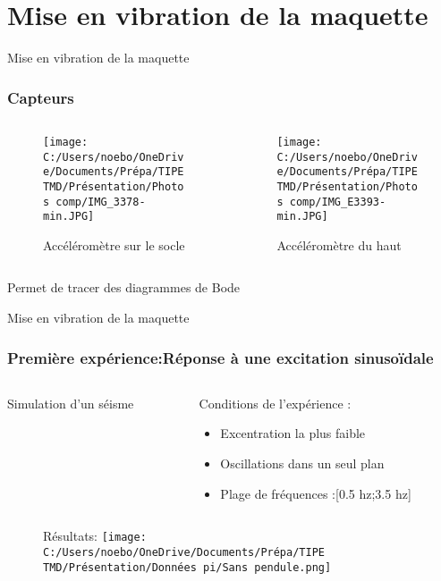 \documentclass{beamer}
\begin{document}
	
	
	\section{Mise en vibration de la maquette}
	
	\begin{frame}{Mise en vibration de la maquette}
		
		\frametitle{Capteurs}
		\begin{columns}
			\begin{column}{0.25\textwidth}
				\begin{figure}
					\texttt{[image: C:/Users/noebo/OneDrive/Documents/Prépa/TIPE TMD/Présentation/Photos comp/IMG\_3378-min.JPG]}
					\caption{Accéléromètre sur le socle}
				\end{figure}
			\end{column}
			\begin{column}{0.5\textwidth}
				\begin{figure}
					\texttt{[image: C:/Users/noebo/OneDrive/Documents/Prépa/TIPE TMD/Présentation/Photos comp/IMG\_E3393-min.JPG]}
					\caption{Accéléromètre du haut}
				\end{figure}
			\end{column}
		\end{columns}
	Permet de tracer des diagrammes de Bode 
	\end{frame}
	
	\begin{frame}{Mise en vibration de la maquette}
		\frametitle{Première expérience:Réponse à une excitation sinusoïdale}
		\begin{columns}
			\begin{column}{0.35\textwidth}
				\alert{Simulation d'un séisme}
			\end{column}
			\begin{column}{0.5\textwidth}
				Conditions de l'expérience :
				\begin{itemize}
					\item Excentration la plus faible 
					\item Oscillations dans un seul plan
					\item Plage de fréquences :[0.5 hz;3.5 hz]
				\end{itemize}	
			\end{column}
		\end{columns}
		
		
		\begin{figure}
			Résultats:
			\texttt{[image: C:/Users/noebo/OneDrive/Documents/Prépa/TIPE TMD/Présentation/Données pi/Sans pendule.png]}
			
		\end{figure}
	\end{frame}
	
\end{document}
